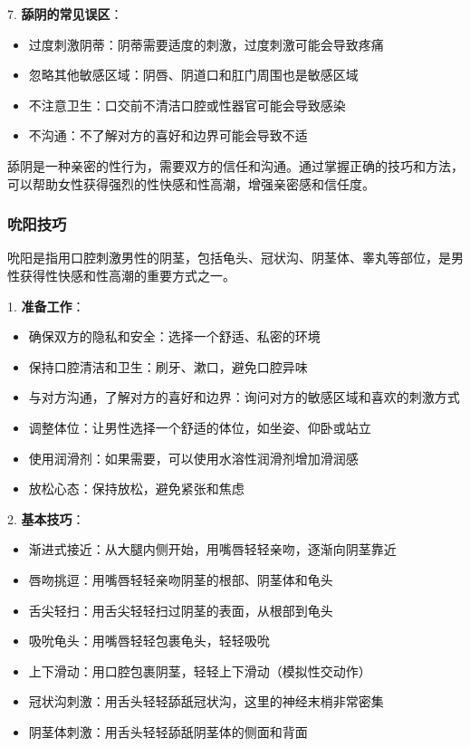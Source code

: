 \documentclass[12pt,UTF8]{ctexbook}
\begin{document}
7. \textbf{舔阴的常见误区}：
  \begin{itemize}
  \item 过度刺激阴蒂：阴蒂需要适度的刺激，过度刺激可能会导致疼痛
  \item 忽略其他敏感区域：阴唇、阴道口和肛门周围也是敏感区域
  \item 不注意卫生：口交前不清洁口腔或性器官可能会导致感染
  \item 不沟通：不了解对方的喜好和边界可能会导致不适
  \end{itemize}

舔阴是一种亲密的性行为，需要双方的信任和沟通。通过掌握正确的技巧和方法，可以帮助女性获得强烈的性快感和性高潮，增强亲密感和信任度。

\subsubsection{吮阳技巧}

吮阳是指用口腔刺激男性的阴茎，包括龟头、冠状沟、阴茎体、睾丸等部位，是男性获得性快感和性高潮的重要方式之一。

1. \textbf{准备工作}：
  \begin{itemize}
  \item 确保双方的隐私和安全：选择一个舒适、私密的环境
  \item 保持口腔清洁和卫生：刷牙、漱口，避免口腔异味
  \item 与对方沟通，了解对方的喜好和边界：询问对方的敏感区域和喜欢的刺激方式
  \item 调整体位：让男性选择一个舒适的体位，如坐姿、仰卧或站立
  \item 使用润滑剂：如果需要，可以使用水溶性润滑剂增加滑润感
  \item 放松心态：保持放松，避免紧张和焦虑
  \end{itemize}

2. \textbf{基本技巧}：
  \begin{itemize}
  \item 渐进式接近：从大腿内侧开始，用嘴唇轻轻亲吻，逐渐向阴茎靠近
  \item 唇吻挑逗：用嘴唇轻轻亲吻阴茎的根部、阴茎体和龟头
  \item 舌尖轻扫：用舌尖轻轻扫过阴茎的表面，从根部到龟头
  \item 吸吮龟头：用嘴唇轻轻包裹龟头，轻轻吸吮
  \item 上下滑动：用口腔包裹阴茎，轻轻上下滑动（模拟性交动作）
  \item 冠状沟刺激：用舌头轻轻舔舐冠状沟，这里的神经末梢非常密集
  \item 阴茎体刺激：用舌头轻轻舔舐阴茎体的侧面和背面
  \end{itemize}
\end{document}
